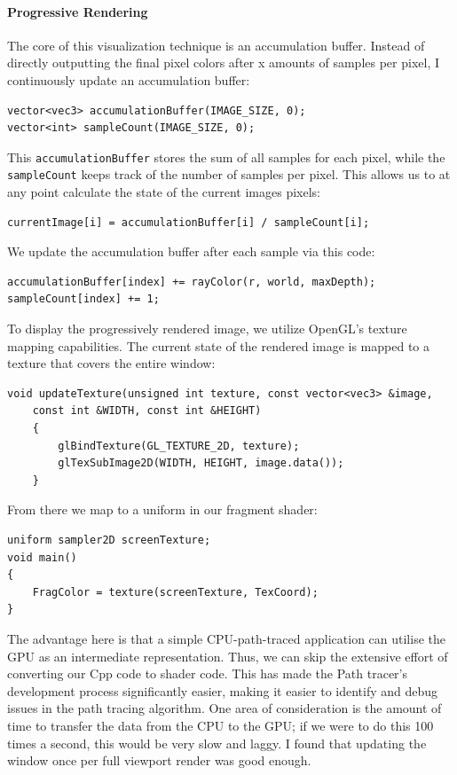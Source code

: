\documentclass[12pt]{article}
\begin{document}
\paragraph{Progressive Rendering} The core of this visualization technique is an accumulation buffer. Instead of directly outputting the final pixel colors after x amounts of samples per pixel, I continuously update an accumulation buffer:

\begin{verbatim}
vector<vec3> accumulationBuffer(IMAGE_SIZE, 0);
vector<int> sampleCount(IMAGE_SIZE, 0);
\end{verbatim}

This \texttt{accumulationBuffer} stores the sum of all samples for each pixel, while the \texttt{sampleCount} keeps track of the number of samples per pixel. This allows us to at any point calculate the state of the current images pixels:
\begin{verbatim}
currentImage[i] = accumulationBuffer[i] / sampleCount[i];
\end{verbatim}

We update the accumulation buffer after each sample via this code:

\begin{verbatim}
accumulationBuffer[index] += rayColor(r, world, maxDepth);
sampleCount[index] += 1;
\end{verbatim}

To display the progressively rendered image, we utilize OpenGL's texture mapping capabilities.
The current state of the rendered image is mapped to a texture that covers the entire window:

\begin{verbatim}
void updateTexture(unsigned int texture, const vector<vec3> &image,
    const int &WIDTH, const int &HEIGHT)
    {
        glBindTexture(GL_TEXTURE_2D, texture);
        glTexSubImage2D(WIDTH, HEIGHT, image.data());
    }
\end{verbatim}

From there we map to a uniform in our fragment shader:

\begin{verbatim}
uniform sampler2D screenTexture;
void main()
{
    FragColor = texture(screenTexture, TexCoord);
}
\end{verbatim}

The advantage here is that a simple CPU-path-traced application can utilise the GPU as an intermediate representation. Thus, we can skip the extensive effort of converting our Cpp code to shader code. This has made the Path tracer's development process significantly easier, making it easier to identify and debug issues in the path tracing algorithm. One area of consideration is the amount of time to transfer the data from the CPU to the GPU; if we were to do this 100 times a second, this would be very slow and laggy. I found that updating the window once per full viewport render was good enough.
\end{document}
